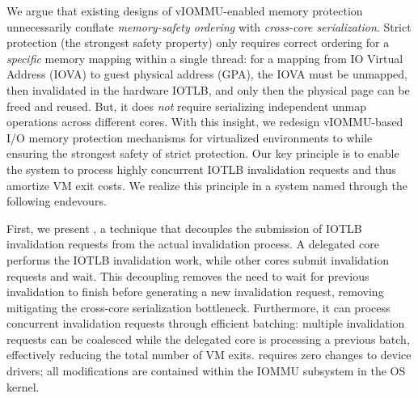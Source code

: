We argue that existing designs of vIOMMU-enabled memory protection
    unnecessarily conflate \emph{memory-safety ordering} 
    with \emph{cross-core serialization}.
Strict protection (the strongest safety property) only requires
    correct ordering
    for a \emph{specific} memory mapping within a single thread:
    for a mapping from IO Virtual Address (IOVA) to guest physical address (GPA),
    the IOVA must be unmapped, then invalidated in the hardware IOTLB, 
    and only then the physical page can be freed and reused.
But, it does \emph{not} require serializing independent unmap operations 
    across different cores.
With this insight, we redesign vIOMMU-based 
    I/O memory protection mechanisms for virtualized environments
    to 
    while ensuring the strongest safety of strict protection.
Our key principle is to enable the system to process highly concurrent 
    IOTLB invalidation requests and thus amortize VM exit costs.
We realize this principle in a system named \brand 
    through the following endevours.

First, we present \emph{\optOne}, a technique that decouples
    the submission of IOTLB invalidation requests from the actual invalidation process.
A delegated core performs the IOTLB invalidation work,
while other cores submit invalidation requests and wait.
This decoupling removes the need to wait for previous invalidation 
    to finish before generating a new invalidation request,
    removing mitigating the cross-core serialization bottleneck.
Furthermore, it can process concurrent invalidation requests through efficient batching:
multiple invalidation requests can be coalesced
while the delegated core is processing a previous batch,
    effectively reducing the total number of VM exits.
\emph{\optOne} requires zero changes to device drivers;
    all modifications are contained within the IOMMU subsystem
    in the OS kernel.


